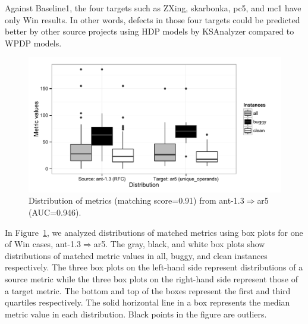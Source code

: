 Against Baseline1, the four targets such as ZXing, skarbonka, pc5, and mc1 have only Win results. In other words, defects in those four targets
could be predicted better by other source projects using HDP models by
KSAnalyzer compared to WPDP models.

\label{sec:why}
\begin{figure}[t]
	\centering
	\includegraphics[width=\linewidth]{Figures/Result/best_dist_bplot.pdf}
	\caption{Distribution of metrics (matching score=0.91)
	from ant-1.3$\Rightarrow$ar5 (AUC=0.946).}
	\label{fig:best_dist}
\end{figure}

In Figure~\ref{fig:best_dist}, we analyzed distributions of matched metrics using box plots for one of Win cases, ant-1.3$\Rightarrow$ar5.
The gray, black, and white box plots show distributions of matched metric values in
all, buggy, and clean instances respectively. The three box plots on the
left-hand side represent distributions of a source metric while the three
box plots on the right-hand side represent those of a target metric. The
bottom and top of the boxes represent the first and third quartiles
respectively.
The solid horizontal line in a box represents the median metric value in each distribution.
Black points in the figure are outliers.

